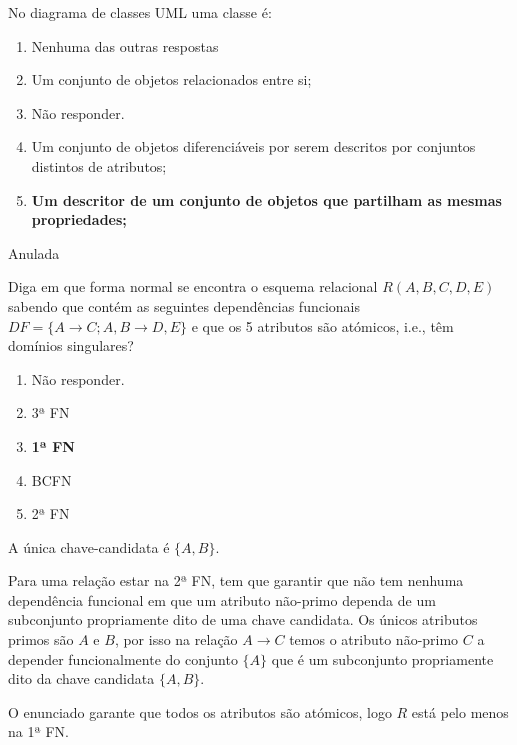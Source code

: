 \documentclass[type=normal, year=2014/15]{bdad_exam}
\begin{document}
{
\renewcommand{\thechapter}{\arabic{chapter}N}
\setcounter{chapter}{14}

No diagrama de classes UML uma classe é:
\begin{enumerate}[label=\alph*.]\itemsep0em
    \item Nenhuma das outras respostas
    \item Um conjunto de objetos relacionados entre si;
    \item Não responder.
    \item Um conjunto de objetos diferenciáveis por serem descritos por conjuntos distintos de atributos;
    \item \textbf{Um descritor de um conjunto de objetos que partilham as mesmas propriedades; \greencheckmark}
\end{enumerate}

Anulada

Diga em que forma normal se encontra o esquema relacional $R(A,B,C,D,E)$ sabendo que contém as seguintes dependências funcionais $DF=\{A \rightarrow C; A,B \rightarrow D,E\}$ e que os 5 atributos são atómicos, i.e., têm domínios singulares?
\begin{enumerate}[label=\alph*.]\itemsep0em
    \item Não responder.
    \item 3ª FN
    \item \textbf{1ª FN \greencheckmark}
    \item BCFN
    \item 2ª FN
\end{enumerate}
A única chave-candidata é $\{A,B\}$.

Para uma relação estar na 2ª FN, tem que garantir que não tem nenhuma dependência funcional em que um atributo não-primo dependa de um subconjunto propriamente dito de uma chave candidata. Os únicos atributos primos são $A$ e $B$, por isso na relação $A \rightarrow C$ temos o atributo não-primo $C$ a depender funcionalmente do conjunto $\{A\}$ que é um subconjunto propriamente dito da chave candidata $\{A,B\}$.

O enunciado garante que todos os atributos são atómicos, logo $R$ está pelo menos na 1ª FN.

}
\end{document}
